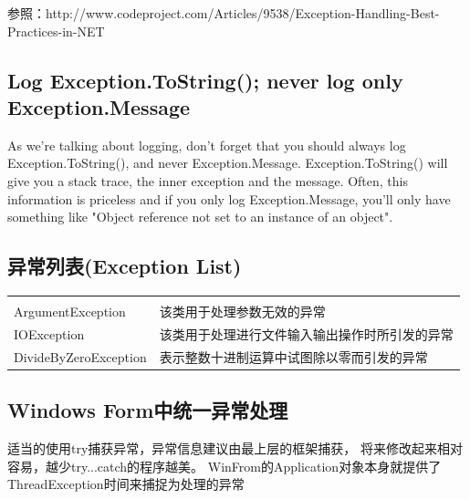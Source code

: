 \documentclass{book}
\begin{document}
参照：http://www.codeproject.com/Articles/9538/Exception-Handling-Best-Practices-in-NET

\subsection{Log Exception.ToString(); never log only Exception.Message}

As we're talking about logging, don't forget that you should always log Exception.ToString(), 
and never Exception.Message. Exception.ToString() will give you a stack trace, 
the inner exception and the message. Often, this information is priceless and if you only log Exception.Message, 
you'll only have something like "Object reference not set to an instance of an object".

\subsection{异常列表(Exception List)}

\begin{tabular}{ll}
	\multirow{1}{*}{}			
	& \multicolumn{1}{c}{}\\
	ArgumentException & 该类用于处理参数无效的异常\\
	IOException & 该类用于处理进行文件输入输出操作时所引发的异常\\	
	DivideByZeroException & 表示整数十进制运算中试图除以零而引发的异常\\					
\end{tabular}

\subsection{Windows Form中统一异常处理}

适当的使用try捕获异常，异常信息建议由最上层的框架捕获，
将来修改起来相对容易，越少try...catch的程序越美。
WinFrom的Application对象本身就提供了ThreadException时间来捕捉为处理的异常
\end{document}
